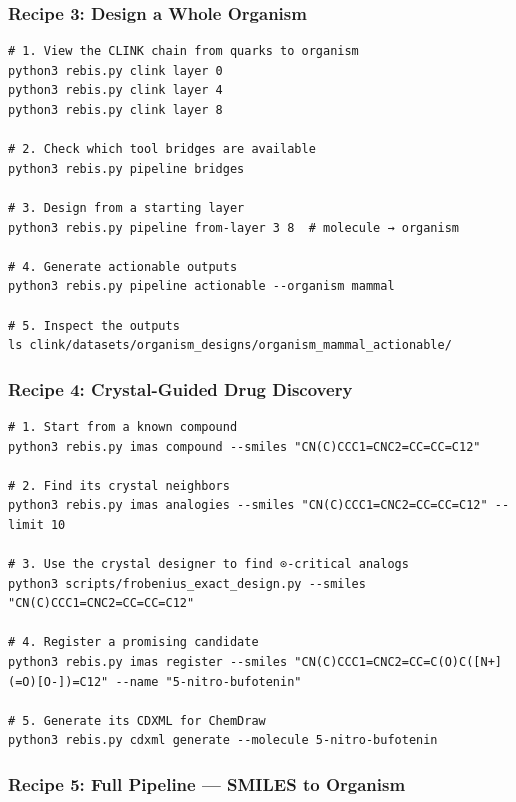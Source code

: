 \documentclass[12pt,a4paper]{article}
\begin{document}
\hypertarget{recipe-3-design-a-whole-organism}{%
\subsubsection{Recipe 3: Design a Whole
Organism}\label{recipe-3-design-a-whole-organism}}

\begin{verbatim}
# 1. View the CLINK chain from quarks to organism
python3 rebis.py clink layer 0
python3 rebis.py clink layer 4
python3 rebis.py clink layer 8

# 2. Check which tool bridges are available
python3 rebis.py pipeline bridges

# 3. Design from a starting layer
python3 rebis.py pipeline from-layer 3 8  # molecule → organism

# 4. Generate actionable outputs
python3 rebis.py pipeline actionable --organism mammal

# 5. Inspect the outputs
ls clink/datasets/organism_designs/organism_mammal_actionable/
\end{verbatim}

\hypertarget{recipe-4-crystal-guided-drug-discovery}{%
\subsubsection{Recipe 4: Crystal-Guided Drug
Discovery}\label{recipe-4-crystal-guided-drug-discovery}}

\begin{verbatim}
# 1. Start from a known compound
python3 rebis.py imas compound --smiles "CN(C)CCC1=CNC2=CC=CC=C12"

# 2. Find its crystal neighbors
python3 rebis.py imas analogies --smiles "CN(C)CCC1=CNC2=CC=CC=C12" --limit 10

# 3. Use the crystal designer to find ⊙-critical analogs
python3 scripts/frobenius_exact_design.py --smiles "CN(C)CCC1=CNC2=CC=CC=C12"

# 4. Register a promising candidate
python3 rebis.py imas register --smiles "CN(C)CCC1=CNC2=CC=C(O)C([N+](=O)[O-])=C12" --name "5-nitro-bufotenin"

# 5. Generate its CDXML for ChemDraw
python3 rebis.py cdxml generate --molecule 5-nitro-bufotenin
\end{verbatim}

\hypertarget{recipe-5-full-pipeline-smiles-to-organism}{%
\subsubsection{Recipe 5: Full Pipeline --- SMILES to
Organism}\label{recipe-5-full-pipeline-smiles-to-organism}}
\end{document}
